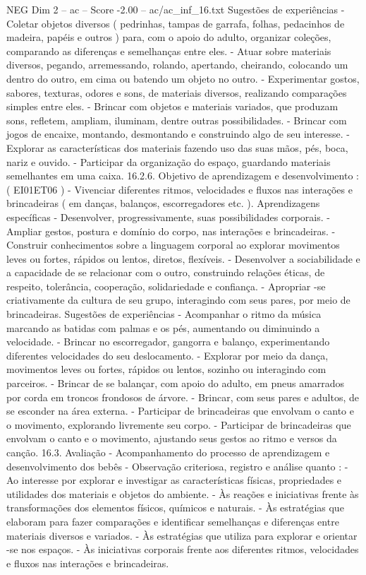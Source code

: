 \begin{textsample}{NEG Dim 2 – ac – Score -2.00 – ac/ac\_inf\_16.txt}
Sugestões de experiências - Coletar objetos diversos ( pedrinhas, tampas de garrafa, folhas, pedacinhos de madeira, papéis e outros ) para, com o apoio do adulto, organizar coleções, comparando as diferenças e semelhanças entre eles. - Atuar sobre materiais diversos, pegando, arremessando, rolando, apertando, cheirando, colocando um dentro do outro, em cima ou batendo um objeto no outro. - Experimentar gostos, sabores, texturas, odores e sons, de materiais diversos, realizando comparações simples entre eles. - Brincar com objetos e materiais variados, que produzam sons, refletem, ampliam, iluminam, dentre outras possibilidades. - Brincar com jogos de encaixe, montando, desmontando e construindo algo de seu interesse. - Explorar as características dos materiais fazendo uso das suas mãos, pés, boca, nariz e ouvido. - Participar da organização do espaço, guardando materiais semelhantes em uma caixa. 16.2.6.
Objetivo de aprendizagem e desenvolvimento : ( EI01ET06 ) - Vivenciar diferentes ritmos, velocidades e fluxos nas interações e brincadeiras ( em danças, balanços, escorregadores etc. ).
Aprendizagens específicas - Desenvolver, progressivamente, suas possibilidades corporais. - Ampliar gestos, postura e domínio do corpo, nas interações e brincadeiras. - Construir conhecimentos sobre a linguagem corporal ao explorar movimentos leves ou fortes, rápidos ou lentos, diretos, flexíveis. - Desenvolver a sociabilidade e a capacidade de se relacionar com o outro, construindo relações éticas, de respeito, tolerância, cooperação, solidariedade e confiança. - Apropriar -se criativamente da cultura de seu grupo, interagindo com seus pares, por meio de brincadeiras.
Sugestões de experiências - Acompanhar o ritmo da música marcando as batidas com palmas e os pés, aumentando ou diminuindo a velocidade. - Brincar no escorregador, gangorra e balanço, experimentando diferentes velocidades do seu deslocamento. - Explorar por meio da dança, movimentos leves ou fortes, rápidos ou lentos, sozinho ou interagindo com parceiros. - Brincar de se balançar, com apoio do adulto, em pneus amarrados por corda em troncos frondosos de árvore. - Brincar, com seus pares e adultos, de se esconder na área externa. - Participar de brincadeiras que envolvam o canto e o movimento, explorando livremente seu corpo. - Participar de brincadeiras que envolvam o canto e o movimento, ajustando seus gestos ao ritmo e versos da canção. 16.3.
Avaliação - Acompanhamento do processo de aprendizagem e desenvolvimento dos bebês - Observação criteriosa, registro e análise quanto : - Ao interesse por explorar e investigar as características físicas, propriedades e utilidades dos materiais e objetos do ambiente. - Às reações e iniciativas frente às transformações dos elementos físicos, químicos e naturais. - Às estratégias que elaboram para fazer comparações e identificar semelhanças e diferenças entre materiais diversos e variados. - Às estratégias que utiliza para explorar e orientar -se nos espaços. - Às iniciativas corporais frente aos diferentes ritmos, velocidades e fluxos nas interações e brincadeiras.

\end{textsample}
